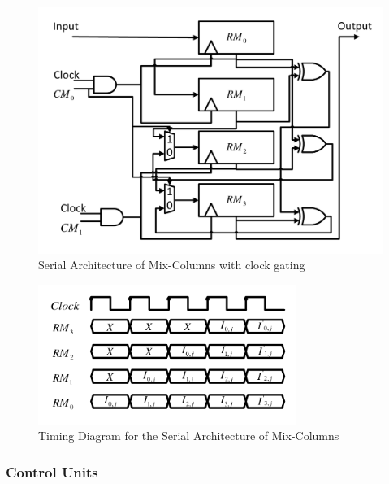 \documentclass[sn-basic]{sn-jnl}%
\begin{document}
\begin{figure}[h]%
    \centering
    \includegraphics[width=\textwidth]{Mix-Columns.pdf}
    \caption{Serial Architecture of Mix-Columns with clock gating}\label{serial_mix_columns_fig}
\end{figure}

\begin{figure}[h]%
    \centering
    \includegraphics[width=0.75\textwidth]{Mix-Columns-Times.pdf}
    \caption{Timing Diagram for the Serial Architecture of Mix-Columns }\label{serial_time_diagrm_mix_colunms}
\end{figure}

\subsubsection{Control Units}\label{subsubsec3}
\end{document}
